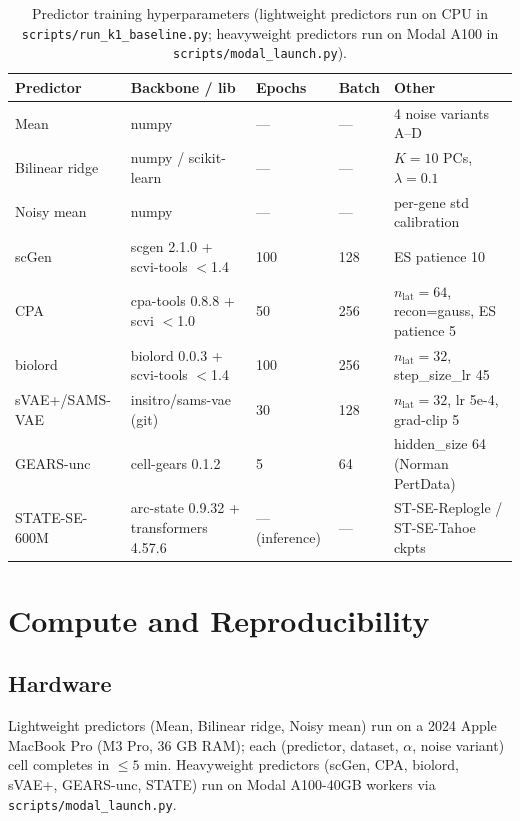 \documentclass{article}
\begin{document}
\begin{table}[h]
\caption{Predictor training hyperparameters (lightweight predictors run on CPU in \texttt{scripts/run\_k1\_baseline.py}; heavyweight predictors run on Modal A100 in \texttt{scripts/modal\_launch.py}).}
\label{tab:hparams}
\centering
\footnotesize
\setlength{\tabcolsep}{4pt}
\begin{tabular}{@{}llll p{3.1cm}@{}}
\toprule
Predictor       & Backbone / lib                  & Epochs   & Batch & Other \\
\midrule
Mean            & numpy                            & ---      & ---   & 4 noise variants A--D \\
Bilinear ridge  & numpy / scikit-learn            & ---      & ---   & $K = 10$ PCs, $\lambda = 0.1$ \\
Noisy mean      & numpy                            & ---      & ---   & per-gene std calibration \\
scGen           & scgen 2.1.0 + scvi-tools $<$1.4 & 100      & 128   & ES patience 10 \\
CPA             & cpa-tools 0.8.8 + scvi $<$1.0   & 50       & 256   & $n_{\text{lat}} = 64$, recon=gauss, ES patience 5 \\
biolord         & biolord 0.0.3 + scvi-tools $<$1.4 & 100     & 256   & $n_{\text{lat}} = 32$, step\_size\_lr 45 \\
sVAE+/SAMS-VAE  & insitro/sams-vae (git)          & 30       & 128   & $n_{\text{lat}} = 32$, lr 5e-4, grad-clip 5 \\
GEARS-unc       & cell-gears 0.1.2                 & 5        & 64    & hidden\_size 64 (Norman PertData) \\
STATE-SE-600M   & arc-state 0.9.32 + transformers 4.57.6 & --- (inference)  & --- & ST-SE-Replogle / ST-SE-Tahoe ckpts \\
\bottomrule
\end{tabular}
\end{table}

\section{Compute and Reproducibility}
\label{app:compute}

\subsection{Hardware}
Lightweight predictors (Mean, Bilinear ridge, Noisy mean) run on a 2024 Apple MacBook Pro (M3 Pro, 36 GB RAM); each (predictor, dataset, $\alpha$, noise variant) cell completes in $\leq 5$ min. Heavyweight predictors (scGen, CPA, biolord, sVAE+, GEARS-unc, STATE) run on Modal A100-40GB workers via \texttt{scripts/modal\_launch.py}.
\end{document}
